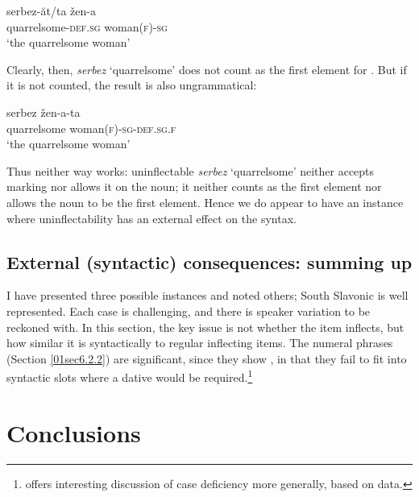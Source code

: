 \documentclass[output=paper,colorlinks,citecolor=brown]{langscibook}
\begin{document}
\begin{exe}
	\ex \label{01ex29}
	\gll *serbez-ăt/ta		žen-a \\
	quarrelsome-\textsc{def.sg} 	woman\textsc{(f)-sg} \\
	\trans ‘the quarrelsome woman’
\end{exe}

Clearly, then, \textit{serbez} `quarrelsome' does not count as the first element for . But if it is not counted, the result is also ungrammatical:

\begin{exe}
	\ex \label{01ex30}
	\gll *serbez	žen-a-ta\footnotemark \\
	quarrelsome	woman\textsc{(f)-sg-def.sg.f} \\
	\trans ‘the quarrelsome woman’
\end{exe}


Thus neither way works: uninflectable \textit{serbez} `quarrelsome' neither accepts  marking nor allows it on the noun; it neither counts as the first element nor allows the noun to be the first element. Hence we do appear to have an instance where uninflectability has an external effect on the syntax.

\subsection{External (syntactic) consequences: summing up}

I have presented three possible instances and noted others; South Slavonic is well represented. Each case is challenging, and there is speaker variation to be reckoned with. In this section, the key issue is not whether the item inflects, but how similar it is syntactically to regular inflecting items. The  numeral phrases (Section \ref{01sec6.2.2}) are significant, since they show , in that they fail to fit into syntactic slots where a dative would be required.\footnote{\citet{testelets2010} offers interesting discussion of case deficiency more generally, based on  data.}

\section{Conclusions} \label{01sec7}
\end{document}

